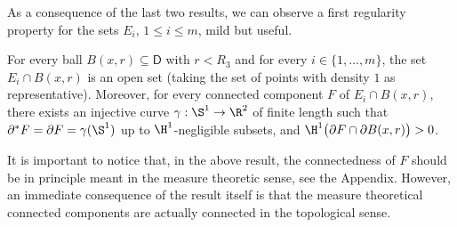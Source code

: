 As a consequence of the last two results, we can observe a first regularity property for the sets $E_i,\, 1\leq i\leq m$, mild but useful.

\begin{lem}\label{lem1reg}
For every ball $B(x,r)\subseteq \mathsf{D}$ with $r<R_3$ and for every $i\in\{1,\dots,m\}$, the set $E_i\cap B(x,r)$ is an open set (taking the set of points with density $1$ as representative). Moreover, for every connected component $F$ of $E_i\cap B(x,r)$, there exists an injective curve $\gamma:\S^1\to\R^2$ of finite length such that $\partial^* F=\partial F=\gamma(\S^1)$ up to $\H^1$-negligible subsets, and $\H^1\big(\partial F\cap \partial B(x,r)\big)>0$.
\end{lem}
It is important to notice that, in the above result, the connectedness of $F$ should be in principle meant in the measure theoretic sense, see the Appendix. However, an immediate consequence of the result itself is that the measure theoretical connected components are actually connected in the topological sense.
